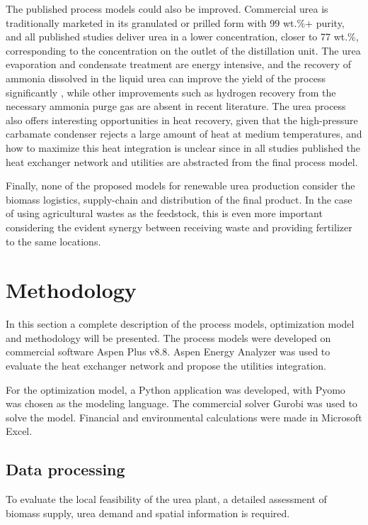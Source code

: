 \documentclass[a4paper, titlepage]{article}
\begin{document}
The published process models could also be improved. Commercial urea is traditionally marketed in its granulated or prilled
form with 99 wt.\%+ purity, and all published studies deliver urea in a lower concentration, closer to 77 wt.\%,
corresponding to the concentration on the outlet of the distillation unit. The urea evaporation and condensate
treatment are energy intensive, and the recovery of ammonia dissolved in the liquid urea can improve the yield of the
process significantly \cite{meessenUreaSynthesis2014}, while other improvements such as hydrogen recovery from the
necessary ammonia purge gas are absent in recent literature. The urea process also offers interesting opportunities
in heat recovery, given that the high-pressure carbamate condenser rejects a large amount of heat at medium
temperatures, and how to maximize this heat integration is unclear since in all studies published the heat exchanger
network and utilities are abstracted from the final process model.

Finally, none of the proposed models for renewable urea production consider the biomass logistics, supply-chain and
distribution of the final product. In the case of using agricultural wastes as the feedstock, this is even more
important considering the evident synergy between receiving waste and providing fertilizer to the same locations.

\section{Methodology}

In this section a complete description of the process models, optimization model and methodology will be presented.
The process models were developed on commercial software Aspen Plus v8.8. Aspen Energy Analyzer was used to evaluate
the heat exchanger network and propose the utilities integration.

For the optimization model, a Python application was developed, with Pyomo was chosen as the modeling language. The
commercial solver Gurobi was used to solve the model. Financial and environmental calculations were made in
Microsoft Excel.

\subsection{Data processing}

To evaluate the local feasibility of the urea plant, a detailed assessment of biomass supply, urea demand and spatial
information is required.
\end{document}
